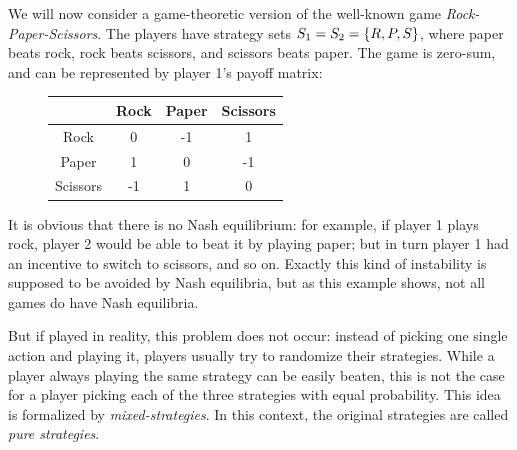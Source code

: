 \documentclass[a4paper]{scrreprt}
\begin{document}
    \begin{ex}
        We will now consider a game-theoretic version of the well-known game \emph{Rock-Paper-Scissors}.
        The players have strategy sets $S_1 = S_2 = \{R, P, S\}$, where paper beats rock, rock beats scissors, and scissors beats paper. The game is zero-sum, and can be represented by player 1's payoff matrix:
        \begin{figure}[h]
            \centering
            \begin{tabular}{c|c|c|c|}
            	         & Rock & Paper & Scissors \\ \hline
            	  Rock   &  0   &  -1   &    1     \\ \hline
            	 Paper   &  1   &   0   &    -1    \\ \hline
            	Scissors &  -1  &   1   &    0     \\ \hline
            \end{tabular}
        \end{figure}
    
        It is obvious that there is no Nash equilibrium: for example, if player 1 plays rock, player 2 would be able to beat it by playing paper; but in turn player 1 had an incentive to switch to scissors, and so on. Exactly this kind of instability is supposed to be avoided by Nash equilibria, but as this example shows, not all games do have Nash equilibria.
        
        But if played in reality, this problem does not occur: instead of picking one single action and playing it, players usually try to randomize their strategies. While a player always playing the same strategy can be easily beaten, this is not the case for a player picking each of the three strategies with equal probability. This idea is formalized by \emph{mixed-strategies}. In this context, the original strategies are called \emph{pure strategies}.
        \label{ex:rockPaperScissors}
    \end{ex}
\end{document}
